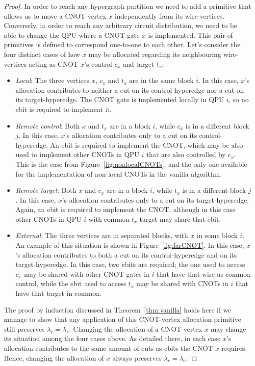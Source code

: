 \begin{proof}
In order to reach any hypergraph partition we need to add a primitive that allows us to move a CNOT-vertex \(x\) independently from its wire-vertices. Conversely, in order to reach any arbitrary circuit distribution, we need to be able to change the QPU where a CNOT gate \(x\) is implemented. This pair of primitives is defined to correspond one-to-one to each other. Let's consider the four distinct cases of how \(x\) may be allocated regarding its neighbouring wire-vertices acting as CNOT \(x\)'s control \(c_x\) and target \(t_x\):
\begin{itemize}
  \item \textit{Local}: The three vertices \(x\), \(c_x\) and \(t_x\) are in the same block \(i\). In this case, \(x\)'s allocation contributes to neither a cut on its control-hyperedge nor a cut on its target-hyperedge. The CNOT gate is implemented locally in QPU \(i\), so no ebit is required to implement it.
  \item \textit{Remote control}: Both \(x\) and \(t_x\) are in a block \(i\), while \(c_x\) is in a different block \(j\). In this case, \(x\)'s allocation contributes only to a cut on its control-hyperedge. An ebit is required to implement the CNOT, which may be also used to implement other CNOTs in QPU \(i\) that are also controlled by \(c_x\). This is the case from Figure~\ref{fig:nonlocalCNOTs}, and the only one available for the implementation of non-local CNOTs in the vanilla algorithm.
  \item \textit{Remote target}: Both \(x\) and \(c_x\) are in a block \(i\), while \(t_x\) is in a different block \(j\). In this case, \(x\)'s allocation contributes only to a cut on its target-hyperedge. Again, an ebit is required to implement the CNOT, although in this case other CNOTs in QPU \(i\) with common \(t_x\) target may share that ebit.
  \item \textit{External}: The three vertices are in separated blocks, with \(x\) in some block \(i\). An example of this situation is shown in Figure~\ref{fig:farCNOT}. In this case, \(x\)'s allocation contributes to both a cut on its control-hyperedge and on its target-hyperedge. In this case, two ebits are required; the one used to access \(c_x\) may be shared with other CNOT gates in \(i\) that have that wire as common control, while the ebit used to access \(t_x\) may be shared with CNOTs in \(i\) that have that target in common.
\end{itemize} 

The proof by induction discussed in Theorem~\ref{thm:vanilla} holds here if we manage to show that any application of this CNOT-vertex allocation primitive still preserves \(\lambda_c = \lambda_e\). Changing the allocation of a CNOT-vertex \(x\) may change its situation among the four cases above. As detailed there, in each case \(x\)'s allocation contributes to the same amount of cuts as ebits the CNOT \(x\) requires. Hence, changing the allocation of \(x\) always preserves \(\lambda_c = \lambda_e\).

\end{proof}

